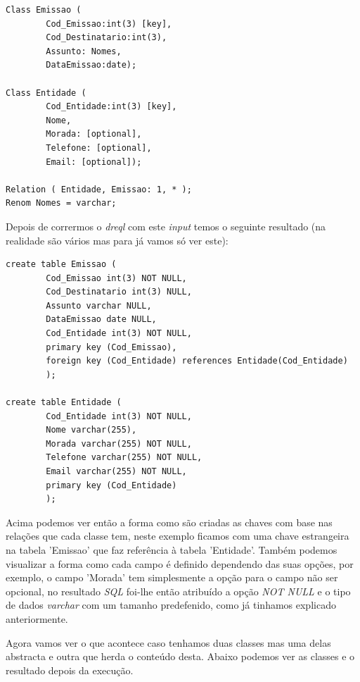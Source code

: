 \documentclass[a4paper]{article}
\begin{document}
\begin{small}
\begin{lstlisting}
Class Emissao (
        Cod_Emissao:int(3) [key],
        Cod_Destinatario:int(3),
        Assunto: Nomes,
        DataEmissao:date);

Class Entidade (
        Cod_Entidade:int(3) [key],
        Nome,
        Morada: [optional],
        Telefone: [optional],
        Email: [optional]);

Relation ( Entidade, Emissao: 1, * );
Renom Nomes = varchar;
\end{lstlisting}
\end{small}

\bigskip
\hspace{1cm}Depois de corrermos o {\em dreql} com este {\em input} temos o seguinte resultado (na realidade são vários mas para já vamos só ver este):\\

\begin{small}
\begin{lstlisting}
create table Emissao (
        Cod_Emissao int(3) NOT NULL,
        Cod_Destinatario int(3) NULL,
        Assunto varchar NULL,
        DataEmissao date NULL,
        Cod_Entidade int(3) NOT NULL,
        primary key (Cod_Emissao),
        foreign key (Cod_Entidade) references Entidade(Cod_Entidade)
        );

create table Entidade (
        Cod_Entidade int(3) NOT NULL,
        Nome varchar(255),
        Morada varchar(255) NOT NULL,
        Telefone varchar(255) NOT NULL,
        Email varchar(255) NOT NULL,
        primary key (Cod_Entidade)
        );
\end{lstlisting}
\end{small}

\bigskip
\hspace{1cm}Acima podemos ver então a forma como são criadas as chaves com base nas relações que cada classe tem, neste exemplo ficamos com uma chave estrangeira na tabela 'Emissao' que faz referência à tabela 'Entidade'. Também podemos visualizar a forma como cada campo é definido dependendo das suas opções, por exemplo, o campo 'Morada' tem simplesmente a opção para o campo não ser opcional, no resultado {\em SQL} foi-lhe então atribuído a opção {\em NOT NULL} e o tipo de dados {\em varchar} com um tamanho predefenido, como já tinhamos explicado anteriormente.

\hspace{1cm}Agora vamos ver o que acontece caso tenhamos duas classes mas uma delas abstracta e outra que herda o conteúdo desta. Abaixo podemos ver as classes e o resultado depois da execução.\\
\end{document}
